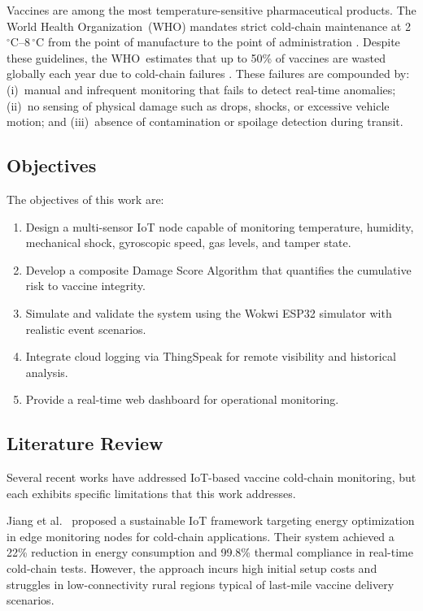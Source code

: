 \documentclass[12pt, a4paper]{article}
\begin{document}
Vaccines are among the most temperature-sensitive pharmaceutical products. The World Health Organization~(WHO) mandates strict cold-chain maintenance at 2\,$^\circ$C--8\,$^\circ$C from the point of manufacture to the point of administration \cite{who_coldchain}. Despite these guidelines, the WHO~estimates that up to 50\% of vaccines are wasted globally each year due to cold-chain failures \cite{who_wastage}. These failures are compounded by: (i)~manual and infrequent monitoring that fails to detect real-time anomalies; (ii)~no sensing of physical damage such as drops, shocks, or excessive vehicle motion; and (iii)~absence of contamination or spoilage detection during transit.

\subsection{Objectives}

The objectives of this work are:
\begin{enumerate}[label=(\roman*)]
  \item Design a multi-sensor IoT node capable of monitoring temperature, humidity, mechanical shock, gyroscopic speed, gas levels, and tamper state.
  \item Develop a composite Damage Score Algorithm that quantifies the cumulative risk to vaccine integrity.
  \item Simulate and validate the system using the Wokwi ESP32 simulator with realistic event scenarios.
  \item Integrate cloud logging via ThingSpeak for remote visibility and historical analysis.
  \item Provide a real-time web dashboard for operational monitoring.
\end{enumerate}

\subsection{Literature Review}
\label{sec:related}

Several recent works have addressed IoT-based vaccine cold-chain monitoring, but each exhibits specific limitations that this work addresses.

Jiang et al.\ \cite{jiang2024} proposed a sustainable IoT framework targeting energy optimization in edge monitoring nodes for cold-chain applications. Their system achieved a 22\% reduction in energy consumption and 99.8\% thermal compliance in real-time cold-chain tests. However, the approach incurs high initial setup costs and struggles in low-connectivity rural regions typical of last-mile vaccine delivery scenarios.
\end{document}
